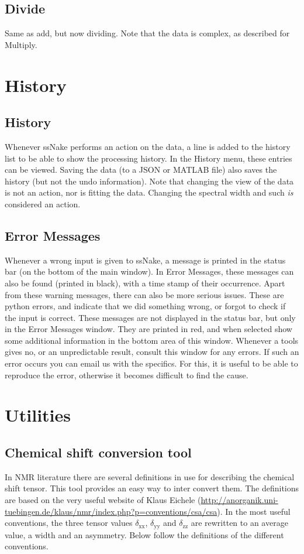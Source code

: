 \documentclass[11pt,a4paper]{article}
\begin{document}
\subsection{Divide}
Same as add, but now dividing. Note that the data is complex, as described for Multiply.



\section{History}
\subsection{History}
Whenever ssNake performs an action on the data, a line is added to the history list to be able to show the processing history. In the History menu, these
entries can be viewed. Saving the data (to a JSON or MATLAB file) also saves the history (but not the undo information). Note that changing the view of the data
is not an action, nor is fitting the data. Changing the spectral width and such \textit{is} considered an action.


\subsection{Error Messages}
Whenever a wrong input is given to ssNake, a message is printed in the status bar (on the bottom of the main window). In Error Messages, these messages
can also be found (printed in black), with a time stamp of their occurrence. Apart from these warning messages, there can also be more serious issues.
These are python errors, and indicate that we did something wrong, or forgot to check if the input is correct. These messages are not displayed in the
status bar, but only in the Error Messages window. They are printed in red, and when selected show some additional information in the bottom area of this window.
Whenever a tools gives no, or an unpredictable result, consult this window for any errors. If such an error occurs you can email us with the specifics.
For this, it is useful to be able to reproduce the error, otherwise it becomes difficult to find the cause.





\section{Utilities}
\subsection{Chemical shift conversion tool}
In NMR literature there are several definitions in use for describing the chemical shift tensor. This tool provides an easy way to inter convert them. The definitions are based on the very useful website of Klaus Eichele (\url{http://anorganik.uni-tuebingen.de/klaus/nmr/index.php?p=conventions/csa/csa}). In the most useful conventions, the three tensor values $\delta_\text{xx}$, $\delta_\text{yy}$ and $\delta_\text{zz}$ are rewritten to an average value, a width and an asymmetry. Below follow the definitions of the different conventions.
\end{document}
